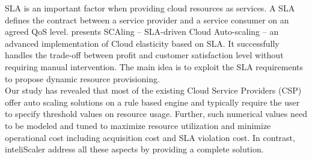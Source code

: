 SLA is an important factor when providing cloud resources as services. A SLA defines the contract between a service provider and a service consumer on an agreed QoS level. \cite{sladriven} presents SCAling – SLA-driven Cloud Auto-scaling – an advanced implementation of Cloud elasticity based on SLA. It successfully handles the trade-off between profit and customer satisfaction level without requiring manual intervention. The main idea is to exploit the SLA requirements to propose dynamic resource provisioning.\\

Our study has revealed that most of the existing Cloud Service Providers (CSP) offer auto scaling solutions on a rule based engine and typically require the user to specify threshold values on resource usage. Further, such numerical values need to be modeled and tuned to maximize resource utilization and minimize operational cost including acquisition cost and SLA violation cost. In contrast, inteliScaler address all these aspects by providing a complete solution.\\
